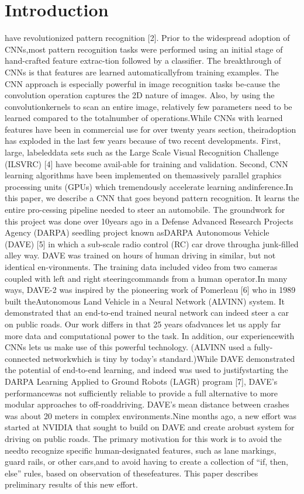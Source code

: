 \documentclass[a4paper]{report}
\begin{document}
		\section{Introduction}
		have revolutionized pattern recognition [2].  Prior to the widespread adoption of CNNs,most pattern recognition tasks were performed using an initial stage of hand-crafted feature extrac-tion followed by a classifier.  The breakthrough of CNNs is that features are learned automaticallyfrom training examples.  The CNN approach is especially powerful in image recognition tasks be-cause the convolution operation captures the 2D nature of images.  Also, by using the convolutionkernels to scan an entire image, relatively few parameters need to be learned compared to the totalnumber of operations.While CNNs with learned features have been in commercial use for over twenty years section,  theiradoption has exploded in the last few years because of two recent developments. First, large, labeleddata sets such as the Large Scale Visual Recognition Challenge (ILSVRC) [4] have become avail-able for training and validation.  Second, CNN learning algorithms have been implemented on themassively parallel graphics processing units (GPUs) which tremendously accelerate learning andinference.In this paper,  we describe a CNN that goes beyond pattern recognition.   It learns the entire pro-cessing pipeline needed to steer an automobile.  The groundwork for this project was done over 10years ago in a Defense Advanced Research Projects Agency (DARPA) seedling project known asDARPA Autonomous Vehicle (DAVE) [5] in which a sub-scale radio control (RC) car drove througha junk-filled alley way. DAVE was trained on hours of human driving in similar, but not identical en-vironments. The training data included video from two cameras coupled with left and right steeringcommands from a human operator.In many ways, DAVE-2 was inspired by the pioneering work of Pomerleau [6] who in 1989 built theAutonomous Land Vehicle in a Neural Network (ALVINN) system. It demonstrated that an end-to-end trained neural network can indeed steer a car on public roads. Our work differs in that 25 years ofadvances let us apply far more data and computational power to the task. In addition, our experiencewith CNNs lets us make use of this powerful technology. (ALVINN used a fully-connected networkwhich is tiny by today’s standard.)While  DAVE  demonstrated  the  potential  of  end-to-end  learning,  and  indeed  was  used  to  justifystarting the DARPA Learning Applied to Ground Robots (LAGR) program [7], DAVE’s performancewas not sufficiently reliable to provide a full alternative to more modular approaches to off-roaddriving. DAVE’s mean distance between crashes was about 20 meters in complex environments.Nine months ago, a new effort was started at NVIDIA that sought to build on DAVE and create arobust system for driving on public roads. The primary motivation for this work is to avoid the needto recognize specific human-designated features, such as lane markings, guard rails, or other cars,and to avoid having to create a collection of “if, then, else” rules, based on observation of thesefeatures. This paper describes preliminary results of this new effort.
\end{document}
